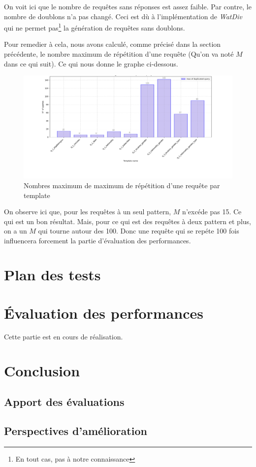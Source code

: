 \documentclass[12pt,titlepage]{article}
\begin{document}
On voit ici que le nombre de requêtes sans réponses est assez faible. Par contre, le nombre de doublons n'a pas changé. Ceci est dù à l'implémentation de \textit{WatDiv} qui ne permet pas\footnote{En tout cas, pas à notre connaissance} la génération de requêtes sans doublons.

Pour remedier à cela, nous avons calculé, comme précisé dans la section précédente, le nombre maximum de répétition d'une requête (Qu'on va noté $M$ dans ce qui suit). Ce qui nous donne le graphe ci-dessous.

\begin{figure}[!h]
  \centering
  \includegraphics[width=1.\textwidth]{img/max_dup.png}
  \caption{Nombres maximum de maximum de répétition d'une requête par template}
  \label{maxdup}
\end{figure}

On observe ici que, pour les requêtes à un seul pattern, $M$ n'excéde pas 15. Ce qui est un bon résultat. Mais, pour ce qui est des requêtes à deux pattern et plus, on a un $M$ qui tourne autour des 100. Donc une requête qui se repéte 100 fois influencera forcement la partie d'évaluation des performances.

\section{Plan des tests}

\section{Évaluation des performances}

Cette partie est en cours de réalisation.

\section{Conclusion}

\subsection{Apport des évaluations}

\subsection{Perspectives d'amélioration}
\end{document}
